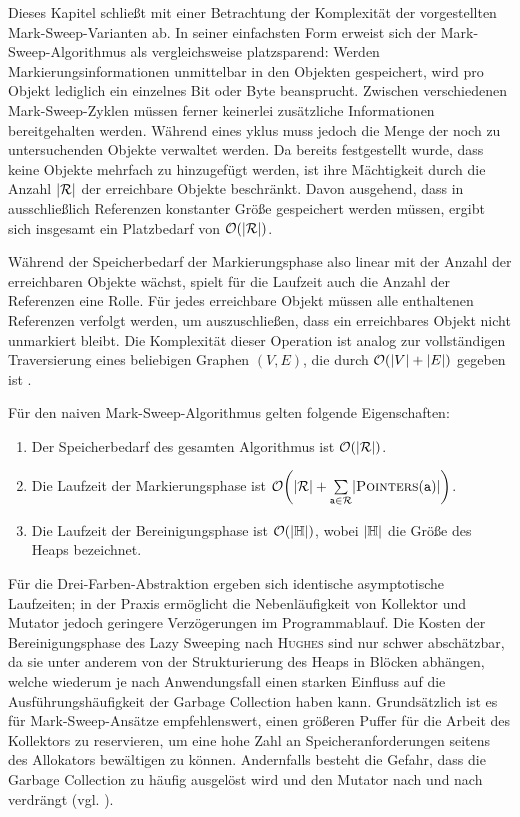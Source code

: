 Dieses Kapitel schließt mit einer Betrachtung der Komplexität der vorgestellten Mark-Sweep-Varianten ab.
In seiner einfachsten Form erweist sich der Mark-Sweep-Algorithmus als vergleichsweise platzsparend:
Werden Markierungsinformationen unmittelbar in den Objekten gespeichert, wird pro Objekt lediglich ein einzelnes Bit oder Byte beansprucht.
Zwischen verschiedenen Mark-Sweep-Zyklen müssen ferner keinerlei zusätzliche Informationen bereitgehalten werden.
Während eines yklus muss jedoch die Menge  der noch zu untersuchenden Objekte verwaltet werden.
Da bereits festgestellt wurde, dass keine Objekte mehrfach zu  hinzugefügt werden, ist ihre Mächtigkeit durch die Anzahl $|\mathcal{R}|$ der erreichbare Objekte beschränkt.
Davon ausgehend, dass in  ausschließlich Referenzen konstanter Größe gespeichert werden müssen, ergibt sich insgesamt ein Platzbedarf von $\mathcal{O}(|\mathcal{R}|)$.

Während der Speicherbedarf der Markierungsphase also linear mit der Anzahl der erreichbaren Objekte wächst, spielt für die Laufzeit auch die Anzahl der Referenzen eine Rolle.
Für jedes erreichbare Objekt müssen alle enthaltenen Referenzen verfolgt werden, um auszuschließen, dass ein erreichbares Objekt nicht unmarkiert bleibt.
Die Komplexität dieser Operation ist analog zur vollständigen Traversierung eines beliebigen Graphen $(V,E)$, die durch $\mathcal{O}(|V|+|E|)$ gegeben ist \cite[Kap. 22]{cormen-leiserson}.

\begin{mybox}
\begin{satz}
	\label{satz:mark-sweep-complexity}
	Für den naiven Mark-Sweep-Algorithmus gelten folgende Eigenschaften:
	\begin{enumerate}[(1)]
		\item Der Speicherbedarf des gesamten Algorithmus ist $\mathcal{O}(|\mathcal{R}|)$.
		\item Die Laufzeit der Markierungsphase ist $\oh\enb{|\Reach|+\sum\limits_{\Var{a} \in \Reach}^{} \abs{\Pointers(\Var{a})}}$.
		\item Die Laufzeit der Bereinigungsphase ist $\mathcal{O}(|\mathbb{H}|)$, wobei $|\mathbb{H}|$ die Größe des Heaps bezeichnet.
	\end{enumerate}
\end{satz}
\end{mybox}

Für die Drei-Farben-Abstraktion ergeben sich identische asymptotische Laufzeiten; in der Praxis ermöglicht die Nebenläufigkeit von Kollektor und Mutator jedoch geringere Verzögerungen im Programmablauf.
Die Kosten der Bereinigungsphase des Lazy Sweeping nach \textsc{Hughes} sind nur schwer abschätzbar, da sie unter anderem von der Strukturierung des Heaps in Blöcken abhängen, welche wiederum je nach Anwendungsfall einen starken Einfluss auf die Ausführungshäufigkeit der Garbage Collection haben kann.
Grundsätzlich ist es für Mark-Sweep-Ansätze empfehlenswert, einen größeren Puffer für die Arbeit des Kollektors zu reservieren, um eine hohe Zahl an Speicheranforderungen seitens des Allokators bewältigen zu können.
Andernfalls besteht die Gefahr, dass die Garbage Collection zu häufig ausgelöst wird und den Mutator nach und nach verdrängt (vgl. \cite[S. 70]{jones-lins}).